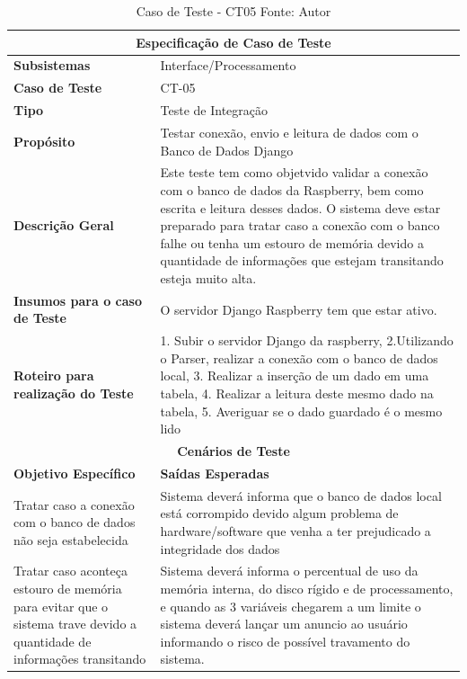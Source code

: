 \begin{table}[H]
    \begin{center}
        \begin{tabular}{|p{5cm}|p{12cm}|}
            \hline
            \multicolumn{2}{|c|}{\textbf{Especificação de Caso de Teste}} \\ \hline
                \textbf{Subsistemas}                               & Interface/Processamento\\ \hline
                \textbf{Caso de Teste}                             & CT-05 \\ \hline
                \textbf{Tipo}                                             & Teste de Integração \\ \hline
                \textbf{Propósito}                                     & Testar conexão, envio e leitura de dados com o Banco de Dados Django \\ \hline
                \textbf{Descrição Geral}                           & Este teste tem como objetvido validar a conexão com o banco de dados da Raspberry, bem como escrita e leitura desses dados. O sistema deve estar preparado para tratar caso a conexão com o banco falhe ou tenha um estouro de memória devido a quantidade de informações que estejam transitando esteja muito alta. \\ \hline
                \textbf{Insumos para o caso de Teste}    & O servidor Django Raspberry tem que estar ativo. \\ \hline
                \textbf{Roteiro para realização do Teste}&  1. Subir o servidor Django da raspberry, 2.Utilizando o Parser, realizar a conexão com o banco de dados local, 3. Realizar a inserção de um dado em uma tabela, 4. Realizar a leitura deste mesmo dado na tabela, 5. Averiguar se o dado guardado é o mesmo lido  \\ \hline
            \multicolumn{2}{|c|}{\textbf{Cenários de Teste}} \\ \hline
                \textbf{Objetivo Específico}                      & \textbf{Saídas Esperadas} \\ \hline
                Tratar caso a conexão com o banco de dados não seja estabelecida & Sistema deverá informa que o banco de dados local está corrompido devido algum problema de hardware/software que venha a ter prejudicado a integridade dos dados \\ \hline
                Tratar caso aconteça estouro de memória para evitar que o sistema trave devido a quantidade de informações transitando & Sistema deverá informa o percentual de uso da memória interna, do disco rígido e de processamento, e quando as 3 variáveis chegarem a um limite o sistema deverá lançar um anuncio ao usuário informando o risco de possível travamento do sistema. \\ \hline
        \end{tabular}
    \end{center}
    \caption[Caso de Teste - CT05]{Caso de Teste - CT05
    \protect Fonte: Autor}
    \label{CT-05}
\end{table}

